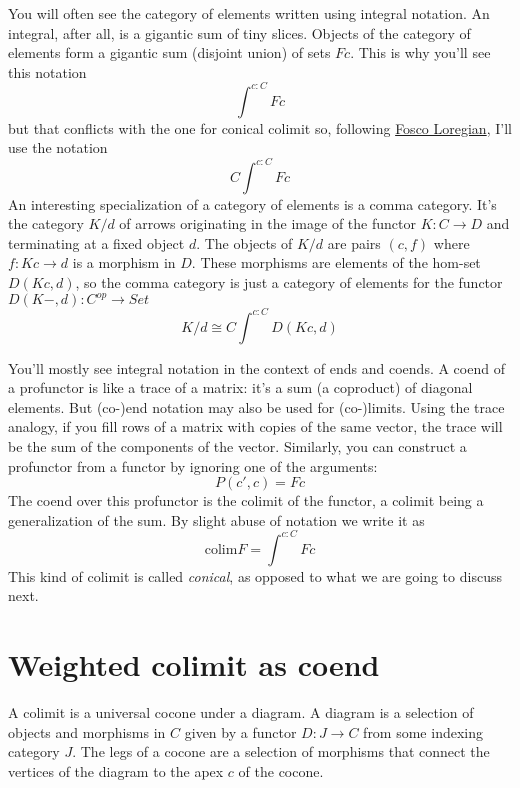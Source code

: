 \documentclass[11pt]{amsart}
\begin{document}
You will often see the category of elements written using integral notation. An integral, after all, is a gigantic sum of tiny slices. Objects of the category of elements form a gigantic sum (disjoint union) of sets $F c$. This is why you'll see this notation
\[\int^{c \colon C} F c\]
but that conflicts with the one for conical colimit so, following \href{https://arxiv.org/abs/1501.02503}{Fosco Loregian}, I'll use the notation
\[C\int^{c \colon C} F c\]
An interesting specialization of a category of elements is a comma category. It's the category $K/d$ of arrows originating in the image of the functor $K \colon C \to D$ and terminating at a fixed object $d$. The objects of $K/d$ are pairs $(c, f)$ where $f \colon K c \to d$ is a morphism in $D$. These morphisms are elements of the hom-set $D(K c , d)$, so the comma category is just a category of elements for the functor $D(K-, d) \colon C^{op} \to Set$
\[K/d \cong C\int^{c\colon C} D(K c, d)\]

You'll mostly see integral notation in the context of ends and coends. A coend of a profunctor is like a trace of a matrix: it's a sum (a coproduct) of diagonal elements. But (co-)end notation may also be used for (co-)limits. Using the trace analogy, if you fill rows of a matrix with copies of the same vector, the trace will be the sum of the components of the vector. Similarly, you can construct a profunctor from a functor by ignoring one of the arguments:
\[ P(c', c) = F c\]
The coend over this profunctor is the colimit of the functor, a colimit being a generalization of the sum. By slight abuse of notation we write it as
\[ \mbox{colim} F = \int^{c \colon C} F c \]
This kind of colimit is called \emph{conical}, as opposed to what we are going to discuss next.
\section{Weighted colimit as coend}
A colimit is a universal cocone under a diagram. A diagram is a selection of objects and morphisms in $C$ given by a functor $D \colon J \to C$ from some indexing category $J$. The legs of a cocone are a selection of morphisms that connect the vertices of the diagram to the apex $c$ of the cocone. 
\end{document}
